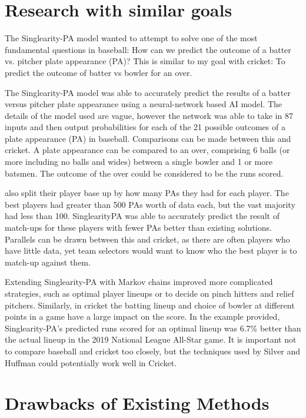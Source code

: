 \documentclass[12pt,a4paper]{report}
\begin{document}
\section{Research with similar goals}

The Singlearity-PA model \citep{silver2021baseball} wanted to attempt to solve one of the most fundamental questions in baseball:	 How can we	predict the outcome of a batter	vs. pitcher plate appearance (PA)? 
This is similar to my goal with cricket:  To predict the outcome of batter vs bowler for an over.

The Singlearity-PA model \citep{silver2021baseball} was able to accurately predict the results of a batter versus pitcher plate appearance using a neural-network based AI model. 
The details of the model used are vague, however the network was able to take in 87 inputs and then output probabilities for each of the 21 possible outcomes of a plate appearance (PA) in baseball. 
Comparisons can be made between this and cricket. 
A plate appearance can be compared to an over, comprising 6 balls (or more including no balls and wides) between a single bowler and 1 or more batsmen. 
The outcome of the over could be considered to be the runs scored. 

\citet{silver2021baseball} also split their player base up by how many PAs they had for each player. 
The best players had greater than 500 PAs worth of data each, but the vast majority had less than 100. 
SinglearityPA was able to accurately predict the result of match-ups for these players with fewer PAs better than existing solutions. 
Parallels can be drawn between this and cricket, as there are often players who have little data, yet team selectors would want to know who the best player is to match-up against them.

Extending Singlearity-PA with Markov chains improved more complicated strategies, such as optimal player lineups or to decide on pinch hitters and relief pitchers. 
Similarly, in cricket the batting lineup and choice of bowler at different points in a game have a large impact on the score. 
In the example provided, Singlearity-PA's predicted runs scored for an optimal lineup was 6.7\% better than the actual lineup in the 2019 National League All-Star game. 
It is important not to compare baseball and cricket too closely, but the techniques used by Silver and Huffman could potentially work well in Cricket.

\section{Drawbacks of Existing Methods}
\end{document}
